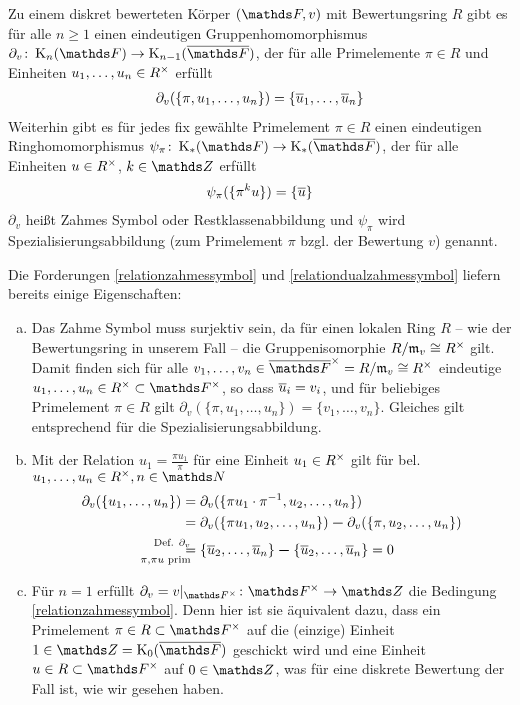 \documentclass[ngerman,fontsize=11pt, paper=a4, parskip=half, titlepage=true, toc=bib]{scrartcl}
\begin{document}
\begin{Satz}\label{zahmessymbolhom}
  Zu einem diskret bewerteten Körper $(\F,v)$ mit Bewertungsring $R$
  gibt es für alle $n\geq 1$ einen eindeutigen Gruppenhomomorphismus 
  $\partial_v\colon \KnF\to \K_{n-1}(\bF)$,
  der für alle Primelemente $\pi\in R$ und 
  Einheiten $u_1,\dotsc, u_n\in R^\times$ erfüllt
  \begin{gather}\label{relationzahmessymbol}
    \partial_v(\{\pi,u_1,\dotsc,u_n\})=\{\overline u_1, \dotsc, \overline u_n\}
  \end{gather}
  Weiterhin gibt es für jedes fix gewählte Primelement $\pi\in R$
  einen eindeutigen Ringhomomorphismus $\psi_\pi\colon\KF\to\KbF$, 
  der für alle Einheiten $u\in R^\times$, $k\in\Z$ erfüllt
  \begin{gather}\label{relationdualzahmessymbol}
    \psi_\pi(\{\pi^ku\})=\{\overline u\}
  \end{gather}
  $\partial_v$ heißt Zahmes Symbol oder Restklassenabbildung und $\psi_\pi$
  wird Spezialisierungsabbildung (zum Primelement $\pi$ bzgl. der
  Bewertung $v$) genannt.
\end{Satz}


\begin{Bem}\label{bemzahmessymbolhom}
  Die Forderungen \ref{relationzahmessymbol} und
  \ref{relationdualzahmessymbol} liefern bereits einige Eigenschaften:
  \begin{enumerate}[a)]
  \item Das Zahme Symbol muss surjektiv sein, da für einen lokalen Ring
    $R$ – wie der Bewertungsring in unserem Fall – die Gruppenisomorphie 
    $R/\mathfrak{m}_v\cong R^\times$ gilt. Damit finden sich für alle 
    $v_1,\dotsc,v_n\in \bFx = R/\frakm_v\cong \Rx$
    eindeutige $u_1,\dotsc, u_n\in\Rx\subset\Fx$, 
    so dass $\overline u_i=v_i$, 
    und für beliebiges Primelement $\pi\in R$ gilt
    $\partial_v(\{\pi,u_1,\dotsc, u_n\})=\{v_1,\dotsc, v_n\}$.
    Gleiches gilt entsprechend für die Spezialisierungsabbildung.
  \item   Mit der Relation $u_1=\frac{\pi u_1}{\pi}$
    für eine Einheit $u_1\in R^\times$
    gilt für bel. $u_1,\dotsc, u_n\in \Rx, n\in\N$
    \begin{align*}
      \partial_v(\{u_1,\dotsc,u_n\})
      &= \partial_v(\{\pi u_1\cdot \pi^{-1},u_2,\dotsc,u_n\})\\
      &= \partial_v(\{\pi u_1,u_2,\dotsc,u_n\})\m 
        \partial_v(\{\pi,u_2,\dotsc,u_n\})\\
      &\overset{\mathllap{\text{Def. }\partial_v}}{
        \underset{\mathllap{\pi,\pi u\text{ prim}}}{=}}
        \{\ov u_2,\dotsc, \ov u_n\} \m \{\ov u_2,\dotsc, \ov u_n\}
        = 0
    \end{align*}
  \item Für $n=1$ erfüllt $\partial_v=v|_{\Fx}\colon \Fx\to \Z$ 
    die Bedingung \ref{relationzahmessymbol}.
    Denn hier ist sie äquivalent dazu, dass ein Primelement 
    $\pi\in R\subset \Fx$ auf die (einzige) Einheit $1\in\Z=\K_0(\bF)$ 
    geschickt wird und eine Einheit $u\in R\subset \Fx$ auf $0\in\Z$,
    was für eine diskrete Bewertung der Fall ist, wie wir gesehen haben.
  \end{enumerate}
\end{Bem}
\end{document}
